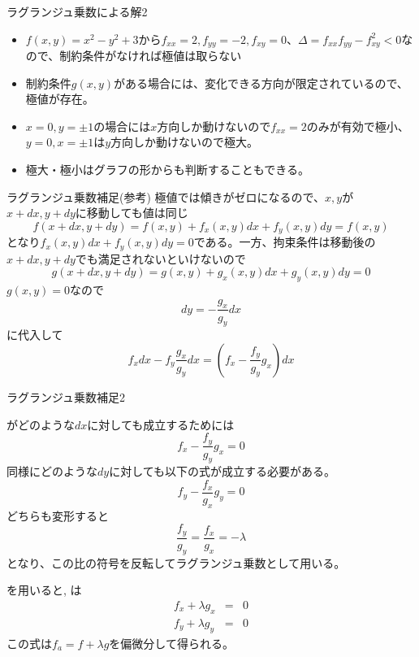 \begin{slide}{ラグランジュ乗数による解2}
\begin{itemize}
\item $f(x,y) = x^2 - y^2 + 3$から$f_{xx} = 2, f_{yy} = -2, f_{xy} =0$、$\Delta = f_{xx}f_{yy} - f_{xy}^2<0$なので、制約条件がなければ極値は取らない
\item 制約条件$g(x,y)$がある場合には、変化できる方向が限定されているので、極値が存在。
\item $x=0, y=\pm 1$の場合には$x$方向しか動けないので$f_{xx}=2$のみが有効で極小、 $y=0, x=\pm 1$は$y$方向しか動けないので極大。
\item 極大・極小はグラフの形からも判断することもできる。
\end{itemize}
\end{slide}
\begin{slide}{ラグランジュ乗数補足(参考)}
極値では傾きがゼロになるので、$x,y$が$x+dx, y+dy$に移動しても値は同じ
\begin{equation}
f(x+dx, y+dy) = f(x, y) + f_x(x,y) dx + f_y(x,y) dy  =f(x,y) \label{eq:lagd}
\end{equation}
となり$f_x(x,y) dx + f_y(x,y) dy = 0$である。一方、拘束条件は移動後の$x+dx, y+dy$でも満足されないといけないので
\begin{equation}
g(x+dx, y+dy) = g(x,y) + g_x(x,y)dx + g_y(x,y) dy = 0 \nonumber
\end{equation}
$g(x,y)=0$なので
\begin{equation}
dy = -\frac{g_x}{g_y} dx \nonumber 
\end{equation}
に代入して
\begin{equation}
f_x dx -f_y \frac{g_x}{g_y} dx= (f_x - \frac{f_y}{g_y} g_x)dx \label{eq:lagd2}
\end{equation}
\end{slide}
\begin{slide}{ラグランジュ乗数補足2}

がどのような$dx$に対しても成立するためには
\begin{equation}
f_x - \frac{f_y}{g_y} g_x = 0 \label{eq:lagf1}
\end{equation}
同様にどのような$dy$に対しても以下の式が成立する必要がある。
\begin{equation}
f_y - \frac{f_x}{g_x}g_y = 0 \label{eq:lagf2}
\end{equation}
どちらも変形すると
\begin{equation}
\frac{f_y}{g_y} = \frac{f_x}{g_x} = -\lambda \label{eq:lm}
\end{equation}
となり、この比の符号を反転してラグランジュ乗数として用いる。

を用いると, は
\begin{eqnarray}
f_x +\lambda g_x &=& 0 \nonumber \\
f_y +\lambda g_y &=& 0 \nonumber 
\end{eqnarray}
この式は$f_a = f + \lambda g$を偏微分して得られる。
\end{slide}
